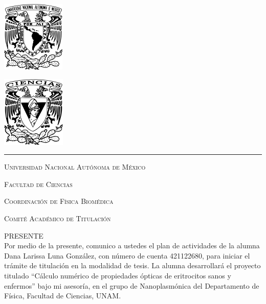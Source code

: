 \documentclass[11pt,letterpaper]{article}
\begin{document}
	
	
	\begin{center}
		\begin{minipage}{3cm}
			\begin{center}
				\includegraphics[height=3.4cm]{Logo_UNAM (1)}
			\end{center}
		\end{minipage}\hfill
		\begin{minipage}{3cm}
			\begin{center}
				\includegraphics[height=3.4cm]{Logo_FC (1)}
			\end{center}
		\end{minipage}
	\end{center}
	
	\rule{17cm}{0.1mm}
	
	\vspace{0.5cm}
	
	\hspace{10cm}{\raggedleft Ciudad Universitaria, 21 de abril de 2025}
	
	\hspace{1cm}
	
	\vspace{0.5cm}
	
	\noindent\textsc{Universidad Nacional Autónoma de México}
	
	\noindent\textsc{Facultad de Ciencias
	}
	
	\noindent\textsc{Coordinación de Física Biomédica
	}
	
	\noindent\textsc{Comité Académico de Titulación
	}
	
	\noindent\textsc{PRESENTE}\\
	
	\noindent
	Por medio de la presente, comunico a ustedes el plan de actividades de la alumna Dana Larissa Luna González, con número de cuenta 421122680, para  iniciar el trámite de titulación en la modalidad de tesis. La alumna desarrollará el proyecto titulado ``Cálculo numérico de propiedades ópticas de eritrocitos sanos y enfermos'' bajo mi asesoría, en el grupo de Nanoplasmónica del Departamento de Física, Facultad de Ciencias, UNAM.\\
	
\end{document}
